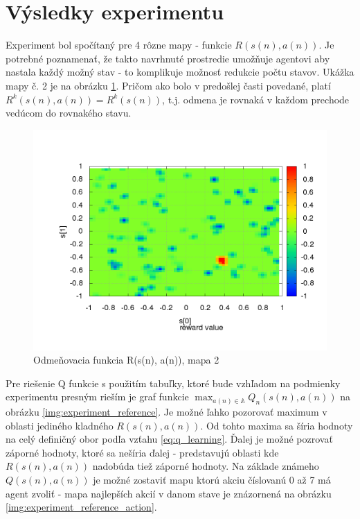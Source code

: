 \section {Výsledky experimentu}

Experiment bol spočítaný pre 4 rôzne mapy - funkcie $R(s(n), a(n))$. Je potrebné
poznamenať, že takto navrhnuté prostredie umožňuje agentovi aby nastala
každý možný stav - to komplikuje možnosť redukcie počtu stavov. Ukážka mapy č. 2
je na obrázku \ref{img:experiment_reward_function}. Pričom ako bolo v predošlej
časti povedané, platí $R^k(s(n), a(n)) = R^k(s(n))$, t.j. odmena je rovnaká v každom
prechode vedúcom do rovnakého stavu.

\begin{figure}[!htb]
\centering
\includegraphics[scale=.4]{../../results_q_learning/map_2/reward_value_surface.png}
\caption{Odmeňovacia funkcia R(s(n), a(n)), mapa 2}
\label{img:experiment_reward_function}
\end{figure}


Pre riešenie Q funkcie s použitím tabuľky, ktoré bude vzhľadom na podmienky experimentu presným
rieším je graf funkcie $\max_{a(n) \in \mathbb{A}} Q_{n}(s(n), a(n))$ na obrázku \ref{img:experiment_reference}.
Je možné ľahko pozorovať maximum v oblasti jediného kladného $R(s(n), a(n))$. Od tohto
maxima sa šíria hodnoty na celý definičný obor podľa vzťahu \ref{eq:q_learning}. Ďalej
je možné pozrovať záporné hodnoty, ktoré sa nešíria ďalej - predstavujú oblasti kde $R(s(n), a(n))$
nadobúda tiež záporné hodnoty. Na základe známeho $Q(s(n),a(n))$ je možné
zostaviť mapu ktorú akciu číslovanú 0 až 7 má agent zvoliť - mapa najlepších
akcií v danom stave je znázornená na obrázku \ref{img:experiment_reference_action}.

